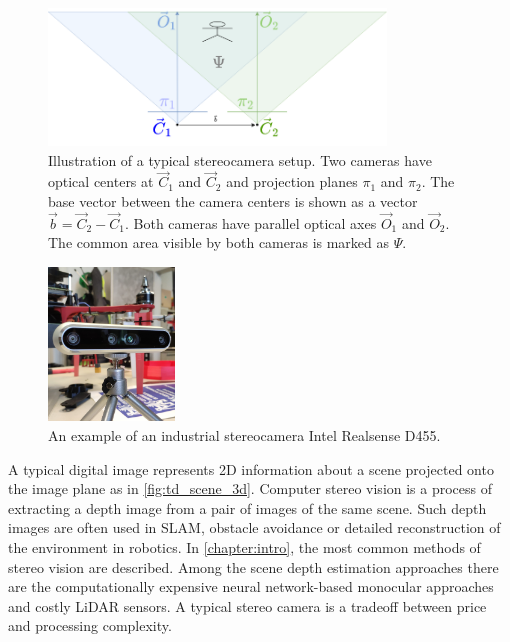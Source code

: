 \begin{figure}[ht]
    \centering
    \includegraphics[width=0.8\textwidth]{graphics/stereopair.png}
    \caption[Illustration of a typical stereocamera setup.]{Illustration of a typical stereocamera setup. Two cameras have optical centers at $\vec{C}_1$ and $\vec{C}_2$ and projection planes $\pi_1$ and $\pi_2$.
    The base vector between the camera centers is shown as a vector $\vec{b} = \vec{C}_2 - \vec{C}_1$. 
    Both cameras have parallel optical axes $\vec{O}_1$ and $\vec{O}_2$. 
    The common area visible by both cameras is marked as $\Psi$.}
    \label{fig:sch_stereo}
\end{figure}
\begin{figure}[ht]
    \centering
    \includegraphics[width=0.3\textwidth]{graphics/stereo_example.jpg}
    \caption[An example of an industrial stereocamera.]{An example of an industrial stereocamera Intel Realsense D455.}
    \label{fig:inteld455}
\end{figure}

A typical digital image represents 2D information about a scene projected onto the image plane as in \autoref{fig:td_scene_3d}.
Computer stereo vision is a process of extracting a depth image from a pair of images of the same scene. 
Such depth images are often used in SLAM, obstacle avoidance or detailed reconstruction of the environment in robotics.
In \autoref{chapter:intro}, the most common methods of stereo vision are described.
Among the scene depth estimation approaches there are the computationally expensive neural network-based monocular approaches and costly LiDAR sensors.
A typical stereo camera is a tradeoff between price and processing complexity.

